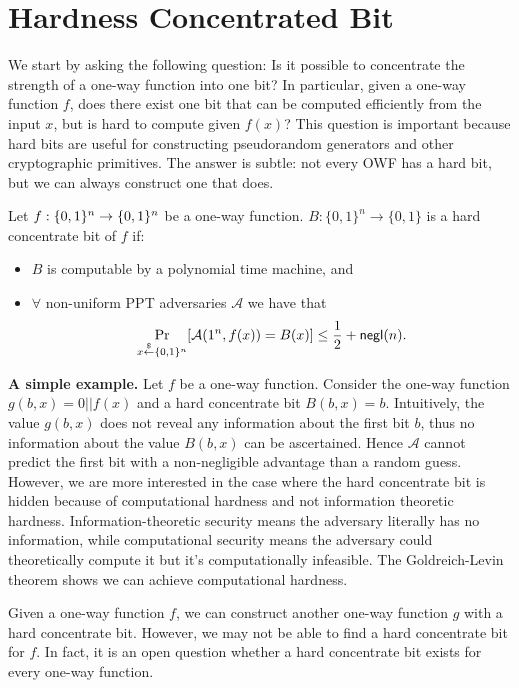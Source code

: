\section{Hardness Concentrated Bit}
We start by asking the following question: Is it possible to concentrate the strength of a one-way function into one bit? In particular, given a one-way function $f$, does there exist one bit that can be computed efficiently from the input $x$, but is hard to compute given $f(x)$? This question is important because hard bits are useful for constructing pseudorandom generators and other cryptographic primitives. The answer is subtle: not every OWF has a hard bit, but we can always construct one that does.
\begin{definition}
Let $f:\{0,1\}^{n} \rightarrow \{0,1\}^{n}$ be a one-way function.
$B:\{0,1\}^n \rightarrow \{0,1\}$ is a hard concentrate bit of $f$ if:
\begin{itemize}
\item[-] $B$ is computable by a polynomial time machine, and
\item[-] $\forall$ non-uniform PPT adversaries $\mathcal{A}$ we have that
	$$\Pr_{x\stackrel{\$}{\leftarrow} \{0,1\}^{n}}[\mathcal{A}(1^n, f(x)) = B(x)] \leq \frac{1}{2} + \mathsf{negl}(n).$$
\end{itemize}
\end{definition}

\noindent\textbf{A simple example.}
Let $f$ be a one-way function. Consider the one-way function $g(b, x) = 0 || f(x)$ and a hard concentrate bit $B(b, x) = b$.
Intuitively, the value $g(b, x)$ does not reveal any information about the first bit $b$, thus no information about the value $B(b, x)$ can be ascertained. Hence $\mathcal{A}$ cannot predict the first bit with a non-negligible advantage than a random guess. However, we are more interested in the case where the hard concentrate bit is hidden because of computational hardness and not information theoretic hardness. Information-theoretic security means the adversary literally has no information, while computational security means the adversary could theoretically compute it but it's computationally infeasible. The Goldreich-Levin theorem shows we can achieve computational hardness.

\bigskip
\begin{remark}
Given a one-way function $f$, we can construct another one-way function $g$ with a hard concentrate bit. However, we may not be able to find a hard concentrate bit for $f$. In fact, it is an open question whether a hard concentrate bit exists for every one-way function.
\end{remark}

